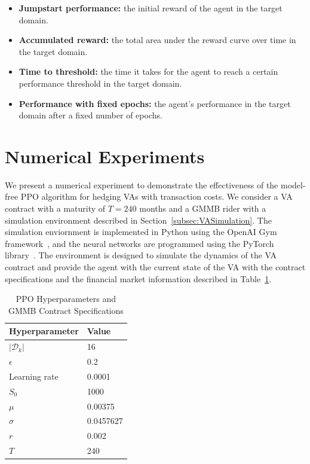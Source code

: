 \begin{itemize}
    \item \textbf{Jumpstart performance:} the initial reward of the agent in the target domain.
    \item \textbf{Accumulated reward:} the total area under the reward curve over time in the target domain.
    \item \textbf{Time to threshold:} the time it takes for the agent to reach a certain performance threshold in the target domain.
    \item \textbf{Performance with fixed epochs:} the agent's performance in the target domain after a fixed number of epochs.
\end{itemize}

\section{Numerical Experiments} \label{sec:Experiments}

We present a numerical experiment to demonstrate the effectiveness of the model-free PPO algorithm for hedging VAs with transaction costs.
We consider a VA contract with a maturity of $T=240$ months and a GMMB rider with a simulation environment described in Section~\ref{subsec:VASimulation}.
The simulation enviornment is implemented in Python using the OpenAI Gym framework~\citep{brockman2016openai}, and the neural networks are programmed using the PyTorch library~\citep{paszke2019pytorch}.
The environment is designed to simulate the dynamics of the VA contract and provide the agent with the current state of the VA with the contract specifications and the financial market information described in Table~\ref{tab3:hyperparameters}.

\begin{table}[ht!]
    \centering
    \begin{tabular}{ll} 
        \toprule
        Hyperparameter      & Value \\
        \midrule
        $|\mathcal{D}_k|$   & 16        \\
        $\epsilon$          & 0.2       \\
        Learning rate       & 0.0001    \\
        $S_0$               & 1000      \\
        $\mu$               & 0.00375   \\
        $\sigma$            & 0.0457627 \\
        $r$                 & 0.002     \\
        $T$                 & 240       \\
        \bottomrule
    \end{tabular}
    \caption{PPO Hyperparameters and GMMB Contract Specifications} 
    \label{tab3:hyperparameters}
\end{table}

